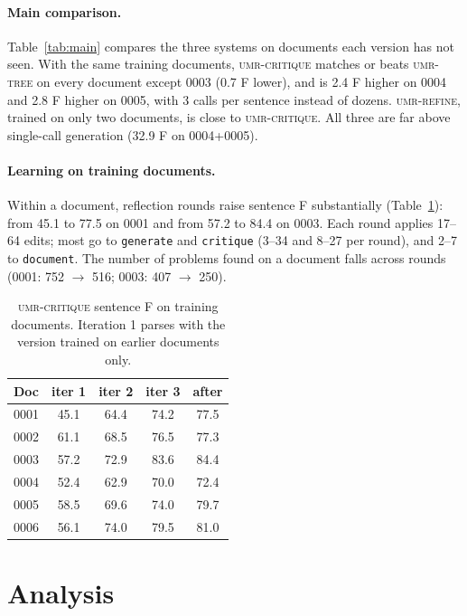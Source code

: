 \documentclass[11pt]{article}
\newcommand{\sys}{\textsc{umr-critique}\xspace}
\newcommand{\tree}{\textsc{umr-tree}\xspace}
\newcommand{\refine}{\textsc{umr-refine}\xspace}
\newcommand{\skill}[1]{\texttt{#1}}
\begin{document}
\paragraph{Main comparison.}
Table~\ref{tab:main} compares the three systems on documents each version has not seen. With the same training documents, \sys matches or beats \tree on every document except 0003 (0.7 F lower), and is 2.4 F higher on 0004 and 2.8 F higher on 0005, with 3 calls per sentence instead of dozens. \refine, trained on only two documents, is close to \sys. All three are far above single-call generation (32.9 F on 0004+0005).

\paragraph{Learning on training documents.}
Within a document, reflection rounds raise sentence F substantially (Table~\ref{tab:train}): from 45.1 to 77.5 on 0001 and from 57.2 to 84.4 on 0003. Each round applies 17--64 edits; most go to \skill{generate} and \skill{critique} (3--34 and 8--27 per round), and 2--7 to \skill{document}. The number of problems found on a document falls across rounds (0001: 752 $\rightarrow$ 516; 0003: 407 $\rightarrow$ 250).

\begin{table}[t]
\centering\small
\setlength{\tabcolsep}{4pt}
\begin{tabular}{@{}lcccc@{}}
\toprule
Doc & iter 1 & iter 2 & iter 3 & after \\
\midrule
0001 & 45.1 & 64.4 & 74.2 & 77.5 \\
0002 & 61.1 & 68.5 & 76.5 & 77.3 \\
0003 & 57.2 & 72.9 & 83.6 & 84.4 \\
0004 & 52.4 & 62.9 & 70.0 & 72.4 \\
0005 & 58.5 & 69.6 & 74.0 & 79.7 \\
0006 & 56.1 & 74.0 & 79.5 & 81.0 \\
\bottomrule
\end{tabular}
\caption{\sys sentence F on training documents. Iteration 1 parses with the version trained on earlier documents only.}
\label{tab:train}
\end{table}

\section{Analysis}
\end{document}

